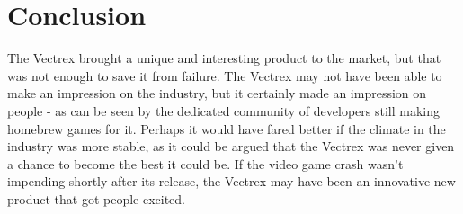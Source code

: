 \documentclass{scrartcl}
\begin{document}
\section*{Conclusion}

The Vectrex brought a unique and interesting product to the market, but that was not enough to save it from  failure. The Vectrex may not have been able to make an impression on the industry, but it certainly made an impression on people - as can be seen by the dedicated community of developers still making homebrew games for it. Perhaps it would have fared better if the climate in the industry was more stable, as it could be argued that the Vectrex was never given a chance to become the best it could be. If the video game crash wasn't impending shortly after its release, the Vectrex may have been an innovative new product that got people excited. 




\end{document}
